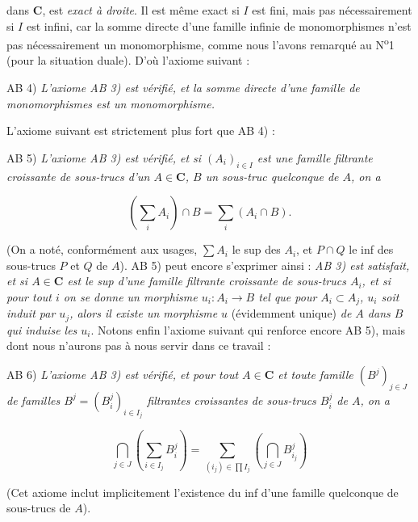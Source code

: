 
\noindent dans $\mathbf{C}$, est \textit{exact à droite}. Il est même exact si $I$ est
fini, mais pas nécessairement si $I$ est infini, car la somme directe d'une
famille infinie de monomorphismes n'est pas nécessairement un monomorphisme,
comme nous l'avons remarqué au N\textsuperscript{o}1 (pour la situation duale).
D'où l'axiome suivant :

\noindent AB 4) \textit{L'axiome \textup{AB 3)} est vérifié, et la somme directe
d'une famille de monomorphismes est un monomorphisme.}

L'axiome suivant est strictement plus fort que AB 4) :

\noindent AB 5) \textit{L'axiome \textup{AB 3)} est vérifié, et si
$(A_i)_{i\in I}$ est une famille filtrante croissante de sous-trucs d'un
$A\in\mathbf{C}$, $B$ un sous-truc quelconque de $A$, on a}

\[
  \left(\sum_i A_i\right)\cap B=\sum_i(A_i\cap B).
\]

\noindent (On a noté, conformément aux usages, $\displaystyle\sum A_i$ le sup des $A_i$, et
$P\cap Q$ le inf des sous-trucs $P$ et $Q$ de $A$).
AB 5) peut encore s'exprimer ainsi : \textit{\textup{AB 3)} est satisfait, et si
$A\in\mathbf{C}$ est le sup d'une famille filtrante croissante de sous-trucs $A_i$, et
si pour tout $i$ on se donne un morphisme
$u_i:A_i\to B$ tel que pour $A_i\subset A_j$, $u_i$ soit induit
par $u_j$, alors il existe un morphisme $u$} (évidemment unique) \textit{de $A$
dans $B$ qui induise les $u_i$}. Notons enfin l'axiome suivant qui renforce
encore AB 5), mais dont nous n'aurons pas à nous servir dans ce travail :

\noindent AB 6) \textit{L'axiome \textup{AB 3)} est vérifié, et pour tout
$A\in\mathbf{C}$ et toute famille $(B^j)_{j\in J}$ de familles
$B^j=(B_i^j)_{i\in I_j}$ filtrantes croissantes de sous-trucs $B_i^j$ de $A$,
on a}

\[
 \bigcap_{j\in J}\left(\sum_{i\in I_j}B_i^j\right)
 =\sum_{(i_j)\in\prod I_j}
   \left(\bigcap_{j\in J}B_{i_j}^j\right)
\]

\noindent (Cet axiome inclut implicitement l'existence du inf d'une famille
quelconque de sous-trucs de $A$).

